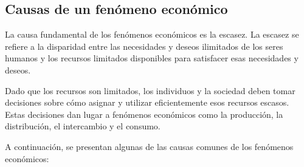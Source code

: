 \documentclass[
  jou,
  floatsintext,
  longtable,
  a4paper,
  nolmodern,
  notxfonts,
  notimes,
  12pt,
  colorlinks=true,linkcolor=blue,citecolor=blue,urlcolor=blue]{apa7}
\begin{document}
\subsection{Causas de un fenómeno
económico}\label{causas-de-un-fenuxf3meno-econuxf3mico}

La causa fundamental de los fenómenos económicos es la escasez. La
escasez se refiere a la disparidad entre las necesidades y deseos
ilimitados de los seres humanos y los recursos limitados disponibles
para satisfacer esas necesidades y deseos.

Dado que los recursos son limitados, los individuos y la sociedad deben
tomar decisiones sobre cómo asignar y utilizar eficientemente esos
recursos escasos. Estas decisiones dan lugar a fenómenos económicos como
la producción, la distribución, el intercambio y el consumo.

A continuación, se presentan algunas de las causas comunes de los
fenómenos económicos:
\end{document}
